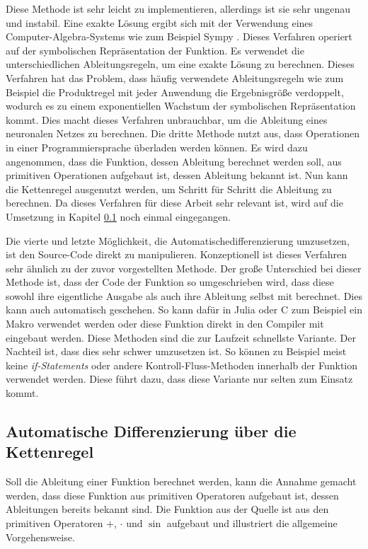 Diese Methode ist sehr leicht zu implementieren, allerdings ist sie sehr ungenau und instabil.
Eine exakte Lösung ergibt sich mit der Verwendung eines Computer-Algebra-Systems wie zum Beispiel Sympy \cite{sympy}.
Dieses Verfahren operiert auf der symbolischen Repräsentation der Funktion.
Es verwendet die unterschiedlichen Ableitungsregeln, um eine exakte Lösung zu berechnen.
Dieses Verfahren hat das Problem, dass häufig verwendete Ableitungsregeln wie zum Beispiel die Produktregel
mit jeder Anwendung die Ergebnisgröße verdoppelt, wodurch es zu einem exponentiellen Wachstum 
der symbolischen Repräsentation kommt.
Dies macht dieses Verfahren unbrauchbar, um die Ableitung eines neuronalen Netzes zu berechnen.
Die dritte Methode nutzt aus, dass Operationen in einer Programmiersprache überladen werden können.
Es wird dazu angenommen, dass die Funktion, dessen Ableitung berechnet werden soll, aus primitiven Operationen aufgebaut ist, dessen Ableitung bekannt ist.
Nun kann die Kettenregel ausgenutzt werden, um Schritt für Schritt die Ableitung zu berechnen.
Da dieses Verfahren für diese Arbeit sehr relevant ist, wird auf die Umsetzung in Kapitel \ref{sec:ketten_regel} noch einmal eingegangen.

Die vierte und letzte Möglichkeit, die Automatischedifferenzierung umzusetzen, ist den Source-Code direkt zu manipulieren.
Konzeptionell ist dieses Verfahren sehr ähnlich zu der zuvor vorgestellten Methode. 
Der große Unterschied bei dieser Methode ist, dass der Code der Funktion so umgeschrieben wird, 
dass diese sowohl ihre eigentliche Ausgabe als auch ihre Ableitung selbst mit berechnet.
Dies kann auch automatisch geschehen.
So kann dafür in Julia oder C zum Beispiel ein Makro verwendet werden oder diese Funktion direkt in den Compiler mit eingebaut werden.
Diese Methoden sind die zur Laufzeit schnellste Variante.
Der Nachteil ist, dass dies sehr schwer umzusetzen ist.
So können zu Beispiel meist keine \textit{if-Statements} oder andere Kontroll-Fluss-Methoden innerhalb der Funktion verwendet werden. 
Diese führt dazu, dass diese Variante nur selten zum Einsatz kommt.

\subsection{Automatische Differenzierung über die Kettenregel} \label{sec:ketten_regel}

Soll die Ableitung einer Funktion berechnet werden, 
kann die Annahme gemacht werden, 
dass diese Funktion aus primitiven Operatoren aufgebaut ist, dessen Ableitungen bereits bekannt sind.
Die Funktion aus der Quelle \cite{autodiff_example} ist aus den primitiven Operatoren $+$, $\cdot$ und $\sin$ aufgebaut und illustriert die allgemeine Vorgehensweise.

